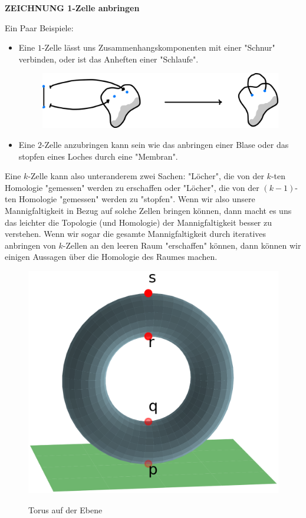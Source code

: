 \textbf{ZEICHNUNG 1-Zelle anbringen}

Ein Paar Beispiele: 
\begin{itemize}
    \item Eine $1$-Zelle lässt uns Zusammenhangskomponenten mit einer "Schnur"
            verbinden, oder ist das Anheften einer "Schlaufe".
            \begin{figure}[H]
                \centering
                \includegraphics[width=0.45\linewidth]{resources/Me-Diagram1-attaching-a-1-cell.jpeg}
                \label{fig:me-diagram1}
            \end{figure}
    \item Eine $2$-Zelle anzubringen kann sein wie das anbringen einer Blase oder
        das stopfen eines Loches durch eine "Membran".
\end{itemize}

Eine $k$-Zelle kann also unteranderem zwei Sachen: "Löcher", die von der $k$-ten 
Homologie "gemessen" werden zu erschaffen oder "Löcher", die von der $(k-1)$-ten 
Homologie "gemessen" werden zu "stopfen". Wenn wir also unsere Mannigfaltigkeit 
in Bezug auf solche Zellen bringen können, dann macht es uns das leichter die 
Topologie (und Homologie) der Mannigfaltigkeit besser zu verstehen. Wenn wir
sogar die gesamte Mannigfaltigkeit durch iteratives anbringen von $k$-Zellen
an den leeren Raum "erschaffen" können, dann können wir einigen Aussagen über 
die Homologie des Raumes machen. 


\begin{figure}[H]
    \centering
    \includegraphics[width=0.6\linewidth]{resources/Me-Diagram2-torus-plane.png}
    \label{fig:me-diagram2}
    \caption{Torus auf der Ebene}
\end{figure}

